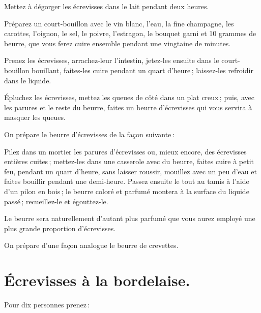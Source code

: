 \label{pg0287} \hypertarget{p0287}{}
Mettez à dégorger les écrevisses dans le lait pendant deux heures.

Préparez un court-bouillon avec le vin blanc, l'eau, la fine champagne, les
carottes, l'oignon, le sel, le poivre, l’estragon, le bouquet garni et 10
grammes de beurre, que vous ferez cuire ensemble pendant une vingtaine de
minutes.

Prenez les écrevisses, arrachez-leur l'intestin, jetez-les ensuite dans le
court-bouillon bouillant, faites-les cuire pendant un quart d'heure ;
laissez-les refroidir dans le liquide.

Épluchez les écrevisses, mettez les queues de côté dans un plat creux ; puis,
avec les parures et le reste du beurre, faites un beurre d'écrevisses qui vous
servira à masquer les queues.

\sk

\label{pg0287-3} \hypertarget{p0287-3}{}
On prépare le beurre d'écrevisses de la façon suivante :

Pilez dans un mortier les parures d'écrevisses ou, mieux encore, des écrevisses
entières cuites ; mettez-les dans une casserole avec du beurre, faites cuire
à petit feu, pendant un quart d'heure, sans laisser roussir, mouillez avec un
peu d’eau et faites bouillir pendant une demi-heure. Passez ensuite le tout au
tamis à l'aide d'un pilon en bois ; le beurre coloré et parfumé montera à la
surface du liquide passé ; recueillez-le et égouttez-le.

Le beurre sera naturellement d'autant plus parfumé que vous aurez employé
une plus grande proportion d'écrevisses.

\sk

On prépare d'une façon analogue le beurre de crevettes.

\section*{\centering Écrevisses à la bordelaise.}

Pour dix personnes prenez :

\medskip

